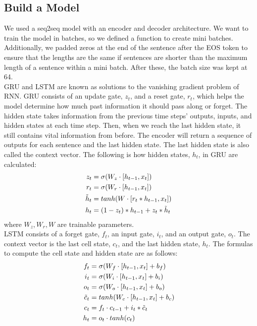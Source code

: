 \documentclass[conference]{IEEEtran}
\begin{document}
\subsection{Build a Model}
\indent We used a seq2seq model with an encoder and decoder architecture. We want to train the model in batches, so we defined a function to create mini batches. Additionally, we padded zeros at the end of the sentence after the EOS token to ensure that the lengths are the same if sentences are shorter than the maximum length of a sentence within a mini batch. After these, the batch size was kept at 64. \\
\indent GRU and LSTM are known as solutions to the vanishing gradient problem of RNN. GRU consists of an update gate, $z_t$, and a reset gate, $r_t$, which helps the model determine how much past information it should pass along or forget. The hidden state takes information from the previous time steps’ outputs, inputs, and hidden states at each time step. Then, when we reach the last hidden state, it still contains vital information from before. The encoder will return a sequence of outputs for each sentence and the last hidden state. The last hidden state is also called the context vector. The following is how hidden states, $h_t$, in GRU are calculated: 
\begin{align}
z_t &= \sigma(W_z \cdot [h_{t-1},x_t]) \\
r_t &= \sigma(W_r \cdot [h_{t-1},x_t]) \\
\Tilde{h}_t &= tanh(W\cdot [r_t*h_{t-1},x_t]) \\
h_t &=(1-z_t)*h_{t-1}+z_t*\Tilde{h}_t 
\end{align}
where $W_z, W_r, W$ are trainable parameters. \\
\indent LSTM consists of a forget gate, $f_t$, an input gate, $i_t$, and an output gate, $o_t$. The context vector is the last cell state, $c_t$, and the last hidden state, $h_t$. The formulas to compute the cell state and hidden state are as follows:
\begin{align}
f_t &=\sigma(W_f\cdot [h_{t-1},x_t] +b_f) \\
i_t &=\sigma(W_i\cdot [h_{t-1},x_t] +b_i) \\
o_t &=\sigma(W_o\cdot [h_{t-1},x_t] +b_o) \\
\Tilde{c}_t &= tanh(W_c \cdot [h_{t-1},x_t] +b_c) \\
c_t &= f_t \cdot c_{t-1} + i_t*\Tilde{c}_t \\
h_t &= o_t \cdot tanh(c_t) 
\end{align}
\end{document}
